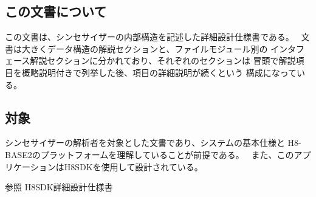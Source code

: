 \hypertarget{index_abstract}{}\subsection{この文書について}\label{index_abstract}
この文書は、シンセサイザーの内部構造を記述した詳細設計仕様書である。~\newline
文書は大きくデータ構造の解説セクションと、ファイルモジュール別の インタフェース解説セクションに分かれており、それぞれのセクションは 冒頭で解説項目を概略説明付きで列挙した後、項目の詳細説明が続くという 構成になっている。\hypertarget{index_target}{}\subsection{対象}\label{index_target}
シンセサイザーの解析者を対象とした文書であり、システムの基本仕様と H8-\/\+B\+A\+S\+E2のプラットフォームを理解していることが前提である。~\newline
また、このアプリケーションは\+H8\+S\+D\+Kを使用して設計されている。

\begin{DoxySeeAlso}{参照}
H8\+S\+D\+K詳細設計仕様書 
\end{DoxySeeAlso}
